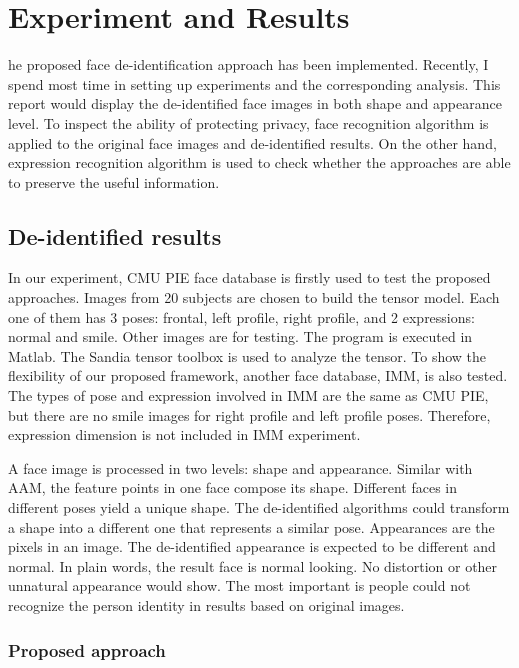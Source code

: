 \chapter{Experiment and Results}

he proposed face de-identification approach has been implemented. Recently, I spend most time in setting up experiments and the corresponding analysis. This report would display the de-identified face images in both shape and appearance level. To inspect the ability of protecting privacy, face recognition algorithm is applied to the original face images and de-identified results. On the other hand, expression recognition algorithm is used to check whether the approaches are able to preserve the useful information.  


\section{De-identified results}
In our experiment, CMU PIE face database is firstly used to test the proposed approaches. Images from 20 subjects are chosen to build the tensor model. Each one of them has 3 poses: frontal, left profile, right profile, and 2 expressions: normal and smile. Other images are for testing. The program is executed in Matlab. The Sandia tensor toolbox is used to analyze the tensor. To show the flexibility of our proposed framework, another face database, IMM, is also tested. The types of pose and expression involved in IMM are the same as CMU PIE, but there are no smile images for right profile and left profile poses. Therefore, expression dimension is not included in IMM experiment. 

A face image is processed in two levels: shape and appearance. Similar with AAM, the feature points in one face compose its shape. Different faces in different poses yield a unique shape. The de-identified algorithms could transform a shape into a different one that represents a similar pose. Appearances are the pixels in an image. The de-identified appearance is expected to be different and normal. In plain words, the result face is normal looking. No distortion or other unnatural appearance would show. The most important is people could not recognize the person identity in results based on original images.


	\subsection{Proposed approach}

